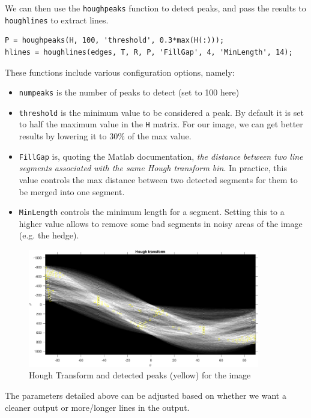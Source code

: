 \documentclass{Configuration_Files/PoliMi3i_thesis}
\begin{document}
We can then use the \verb|houghpeaks| function to detect peaks, and pass the results to \verb|houghlines| to extract lines.
\newpage
\begin{verbatim}
P = houghpeaks(H, 100, 'threshold', 0.3*max(H(:)));
hlines = houghlines(edges, T, R, P, 'FillGap', 4, 'MinLength', 14);
\end{verbatim}

These functions include various configuration options, namely:
\begin{itemize}
	\item \verb|numpeaks| is the number of peaks to detect (set to 100 here)
	\item \verb|threshold| is the minimum value to be considered a peak. By default it is set to half the maximum value in the \verb|H| matrix. For our image, we can get better results by lowering it to 30\% of the max value.
	\item \verb|FillGap| is, quoting the Matlab documentation, \emph{the distance between two line segments associated with the same Hough transform bin}. In practice, this value controls the max distance between two detected segments for them to be merged into one segment.
	\item \verb|MinLength| controls the minimum length for a segment. Setting this to a higher value allows to remove some bad segments in noisy areas of the image (e.g. the hedge).
\end{itemize}

\begin{figure}[H]
    \centering
    \includegraphics[width=0.9\textwidth]{output/F1_hough_peaks.png}
    \caption{Hough Transform and detected peaks (yellow) for the image}
    \label{fig:f1_hough_peaks}
\end{figure}
\newpage

The parameters detailed above can be adjusted based on whether we want a cleaner output or more/longer lines in the output.
\end{document}
